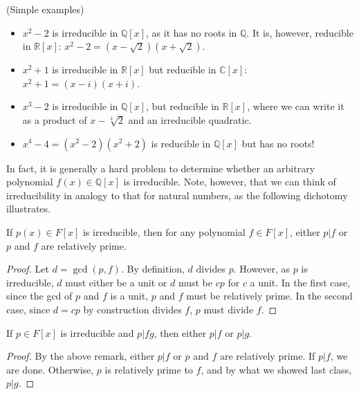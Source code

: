 \documentclass{../mathnotes}
\begin{document}
\begin{exmp}(Simple examples)
    \begin{itemize}
        \item $x^2-2$ is irreducible in $\mathbb{Q}[x]$, as it has no roots in $\mathbb{Q}$. It is, however,
            reducible in $\mathbb{R}[x]$: $x^2-2=(x-\sqrt{2})(x+\sqrt{2})$.
        \item $x^2+1$ is irreducible in $\mathbb{R}[x]$ but reducible in $\mathbb{C}[x]$: $x^2+1=(x-i)(x+i)$.
        \item $x^3-2$ is irreducible in $\mathbb{Q}[x]$, but reducible in $\mathbb{R}[x]$, where we can write
            it as a product of $x-\sqrt[3]{2}$ and an irreducible quadratic.
        \item $x^4-4=(x^2-2)(x^2+2)$ is reducible in $\mathbb{Q}[x]$ but has no roots!
    \end{itemize}
\end{exmp}
In fact, it is generally a hard problem to determine whether an arbitrary polynomial $f(x)\in\mathbb{Q}[x]$ is
irreducible. Note, however, that we can think of irreducibility in analogy to that for natural numbers, as
the following dichotomy illustrates.
\begin{rem}
    If $p(x)\in F[x]$ is irreducible, then for any polynomial $f\in F[x]$, either $p|f$ or $p$ and $f$ are
    relatively prime.
\end{rem}
\begin{proof}
    Let $d=\gcd(p,f)$. By definition, $d$ divides $p$. However, as $p$ is irreducible, $d$ must either be
    a unit or $d$ must be $cp$ for $c$ a unit. In the first case, since the gcd of $p$ and $f$ is a unit,
    $p$ and $f$ must be relatively prime. In the second case, since $d=cp$ by construction divides $f$,
    $p$ must divide $f$.
\end{proof}

\begin{cor}
    If $p\in F[x]$ is irreducible and $p|fg$, then either $p|f$ or $p|g$.
\end{cor}
\begin{proof}
    By the above remark, either $p|f$ or $p$ and $f$ are relatively prime.
    If $p|f$, we are done. Otherwise, $p$ is relatively prime to $f$, and by what we showed last class,
    $p|g$.
\end{proof}
\end{document}
